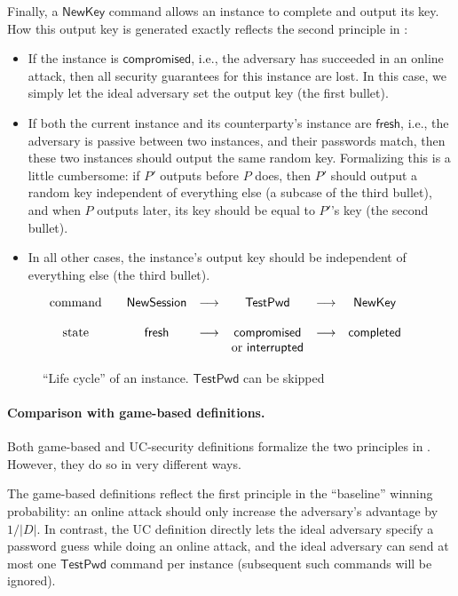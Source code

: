 \documentclass{article}
\newcommand{\NewSession}{\mathsf{NewSession}}
\newcommand{\TestPwd}{\mathsf{TestPwd}}
\newcommand{\NewKey}{\mathsf{NewKey}}
\newcommand{\fresh}{\mathsf{fresh}}
\newcommand{\compromised}{\mathsf{compromised}}
\newcommand{\interrupted}{\mathsf{interrupted}}
\newcommand{\completed}{\mathsf{completed}}
\begin{document}
Finally, a $\NewKey$ command allows an instance to complete and output its key. How this output key is generated exactly reflects the second principle in :
\begin{itemize}
  \item If the instance is $\compromised$, i.e., the adversary has succeeded in an online attack, then all security guarantees for this instance are lost. In this case, we simply let the ideal adversary set the output key (the first bullet).
  \item If both the current instance and its counterparty's instance are $\fresh$, i.e., the adversary is passive between two instances, and their passwords match, then these two instances should output the same random key. Formalizing this is a little cumbersome: if $P'$ outputs before $P$ does, then $P'$ should output a random key independent of everything else (a subcase of the third bullet), and when $P$ outputs later, its key should be equal to $P'$'s key (the second bullet).
  \item In all other cases, the instance's output key should be independent of everything else (the third bullet).
\end{itemize}
\begin{figure}[H]
\begin{center}
$
\begin{array}{c c c c c c c}
\text{command} & & \NewSession & \longrightarrow & \TestPwd & \longrightarrow & \NewKey \\
\\
\text{state} & & \fresh & \longrightarrow & \compromised & \longrightarrow & \completed \\
 & & & & \text{or }\interrupted & &
\end{array}
$
\end{center}
\caption{``Life cycle'' of an instance. $\TestPwd$ can be skipped}
\end{figure}
\paragraph{Comparison with game-based definitions.}
Both game-based and UC-security definitions formalize the two principles in . However, they do so in very different ways.

The game-based definitions reflect the first principle in the ``baseline'' winning probability: an online attack should only increase the adversary's advantage by $1/|D|$. In contrast, the UC definition directly lets the ideal adversary specify a password guess while doing an online attack, and the ideal adversary can send at most one $\TestPwd$ command per instance (subsequent such commands will be ignored).
\end{document}
